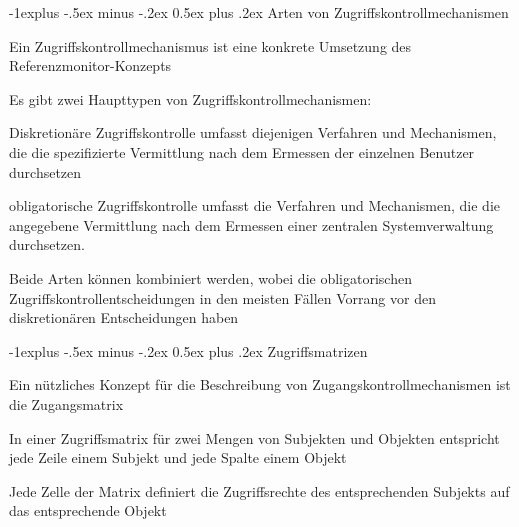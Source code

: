 \documentclass[a4paper]{article}
\makeatletter
\renewcommand{\subsection}{\@startsection{subsection}{2}{0mm}%
 {-1explus -.5ex minus -.2ex}%
 {0.5ex plus .2ex}%
 {\normalfont\normalsize\bfseries}}
\makeatother
\begin{document}
\begin{multicols}{3}
      \subsection{Arten von Zugriffskontrollmechanismen}
      \begin{itemize*}
            \item Ein Zugriffskontrollmechanismus ist eine konkrete Umsetzung des Referenzmonitor-Konzepts
            \item Es gibt zwei Haupttypen von Zugriffskontrollmechanismen:
            \begin{description*}
                  \item[Diskretionäre Zugriffskontrolle] umfasst diejenigen Verfahren und Mechanismen, die die spezifizierte Vermittlung nach dem Ermessen der einzelnen Benutzer durchsetzen
                  \item[obligatorische Zugriffskontrolle] umfasst die Verfahren und Mechanismen, die die angegebene Vermittlung nach dem Ermessen einer zentralen Systemverwaltung durchsetzen.
            \end{description*}
            \item Beide Arten können kombiniert werden, wobei die obligatorischen Zugriffskontrollentscheidungen in den meisten Fällen Vorrang vor den diskretionären Entscheidungen haben
      \end{itemize*}

      \subsection{Zugriffsmatrizen}
      \begin{itemize*}
            \item Ein nützliches Konzept für die Beschreibung von Zugangskontrollmechanismen ist die Zugangsmatrix
            \item In einer Zugriffsmatrix für zwei Mengen von Subjekten und Objekten entspricht jede Zeile einem Subjekt und jede Spalte einem Objekt
            \item Jede Zelle der Matrix definiert die Zugriffsrechte des entsprechenden Subjekts auf das entsprechende Objekt
      \end{itemize*}


\end{multicols}
\end{document}
